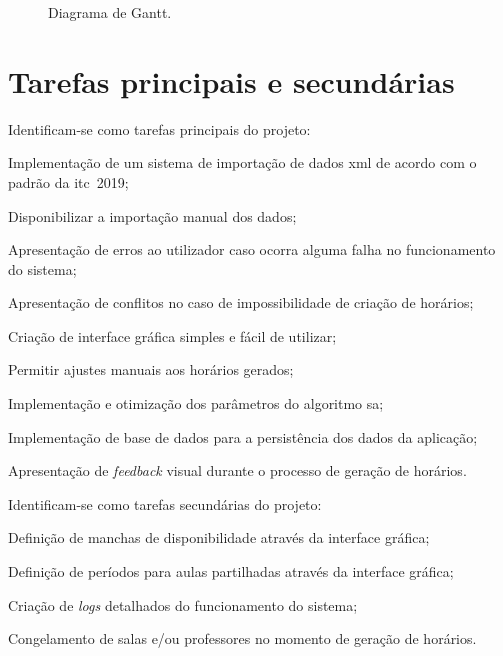 \begin{figure}[H]
\begin{ganttchart}
    
    \end{ganttchart}
    \caption{Diagrama de Gantt.}
    \label{fig:diagrama-gantt}
\end{figure}

\section{Tarefas principais e secundárias}
\label{capitulo3:Tarefas-principais-secundarias}

Identificam-se como tarefas principais do projeto:

\begin{compactitem}
    \item Implementação de um sistema de importação de dados \gls{xml} de acordo com o padrão da \gls{itc}~2019;
    \item Disponibilizar a importação manual dos dados;
    \item Apresentação de erros ao utilizador caso ocorra alguma falha no funcionamento do sistema;
    \item Apresentação de conflitos no caso de impossibilidade de criação de horários;
    \item Criação de interface gráfica simples e fácil de utilizar;
    \item Permitir ajustes manuais aos horários gerados;
    \item Implementação e otimização dos parâmetros do algoritmo \gls{sa};
    \item Implementação de base de dados para a persistência dos dados da aplicação;
    \item Apresentação de \textit{feedback} visual durante o processo de geração de horários.
\end{compactitem}

Identificam-se como tarefas secundárias do projeto:

\begin{compactitem}
    \item Definição de manchas de disponibilidade através da interface gráfica;
    \item Definição de períodos para aulas partilhadas através da interface gráfica;
    \item Criação de \textit{logs} detalhados do funcionamento do sistema;
    \item Congelamento de salas e/ou professores no momento de geração de horários.
\end{compactitem}


